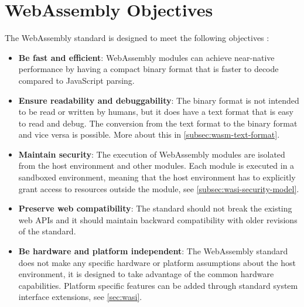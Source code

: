 \section{WebAssembly Objectives}
\label{sec:wasm-objectives}

The WebAssembly standard is designed to meet the following objectives \cite{mozillacorporation_2023_webassembly}:
\begin{itemize}
  \item \textbf{Be fast and efficient}: WebAssembly modules can achieve near-native performance by having a compact binary format that is faster to decode compared to JavaScript parsing.
  \item \textbf{Ensure readability and debuggability}: The binary format is not intended to be read or written by humans, but it does have a text format that is easy to read and debug. The conversion from the text format to the binary format and vice versa is possible. More about this in \autoref{subsec:wasm-text-format}.
  \item \textbf{Maintain security}: The execution of WebAssembly modules are isolated from the host environment and other modules. Each module is executed in a sandboxed environment, meaning that the host environment has to explicitly grant access to resources outside the module, see \autoref{subsec:wasi-security-model}. 
  \item \textbf{Preserve web compatibility}: The standard should not break the existing web APIs and it should maintain backward compatibility with older revisions of the standard.
  \item \textbf{Be hardware and platform independent}: The WebAssembly standard does not make any specific hardware or platform assumptions about the host environment, it is designed to take advantage of the common hardware capabilities. Platform specific features can be added through standard system interface extensions, see \autoref{sec:wasi}.
\end{itemize}